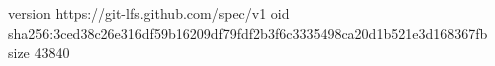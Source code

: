 version https://git-lfs.github.com/spec/v1
oid sha256:3ced38c26e316df59b16209df79fdf2b3f6c3335498ca20d1b521e3d168367fb
size 43840
